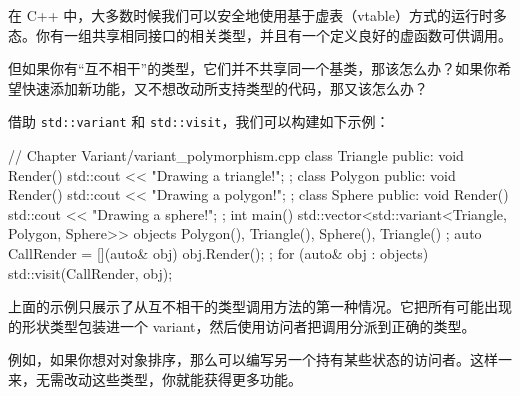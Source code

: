 在 C++ 中，大多数时候我们可以安全地使用基于虚表（vtable）方式的运行时多态。你有一组共享相同接口的相关类型，并且有一个定义良好的虚函数可供调用。

但如果你有“互不相干”的类型，它们并不共享同一个基类，那该怎么办？如果你希望快速添加新功能，又不想改动所支持类型的代码，那又该怎么办？

借助 \texttt{std::variant} 和 \texttt{std::visit}，我们可以构建如下示例：

\begin{codebox}[cpp]
// Chapter Variant/variant_polymorphism.cpp
class Triangle
{
public:
void Render()
{ std::cout << "Drawing a triangle!\n"; }
};
class Polygon
{
public:
void Render() { std::cout << "Drawing a polygon!\n"; }
};
class Sphere
{
public:
void Render() { std::cout << "Drawing a sphere!\n"; }
};
int main()
{
std::vector<std::variant<Triangle, Polygon, Sphere>> objects {
Polygon(),
Triangle(),
Sphere(),
Triangle()
};
auto CallRender = [](auto& obj) { obj.Render(); };
for (auto& obj : objects)
std::visit(CallRender, obj);
}
\end{codebox}

上面的示例只展示了从互不相干的类型调用方法的第一种情况。它把所有可能出现的形状类型包装进一个 variant，然后使用访问者把调用分派到正确的类型。

例如，如果你想对对象排序，那么可以编写另一个持有某些状态的访问者。这样一来，无需改动这些类型，你就能获得更多功能。
